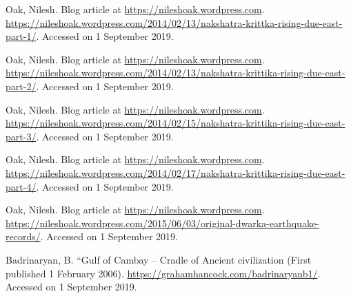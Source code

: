 \begin{thebibliography}{99}
  Oak, Nilesh. Blog article at \url{https://nileshoak.wordpress.com}. \url{https://nileshoak.wordpress.com/2014/02/13/nakshatra-krittka-rising-due-east-part-1/}. Accessed on 1 September 2019.

  Oak, Nilesh. Blog article at \url{ https://nileshoak.wordpress.com}. \url{https://nileshoak.wordpress.com/2014/02/13/nakshatra-krittika-rising-due-east-part-2/}. Accessed on 1 September 2019.

  Oak, Nilesh. Blog article at \url{https://nileshoak.wordpress.com}. \url{https://nileshoak.wordpress.com/2014/02/15/nakshatra-krittika-rising-due-east-part-3/}. Accessed on 1 September 2019.

  Oak, Nilesh. Blog article at \url{https://nileshoak.wordpress.com}. \url{https://nileshoak.wordpress.com/2014/02/17/nakshatra-krittika-rising-due-east-part-4/}. Accessed on 1 September 2019.

  Oak, Nilesh. Blog article at \url{https://nileshoak.wordpress.com}. \url{https://nileshoak.wordpress.com/2015/06/03/original-dwarka-earthquake-records/}. Accessed on 1 September 2019.

  Badrinaryan, B. “Gulf of Cambay – Cradle of Ancient civilization (First published 1 February 2006). \url{https://grahamhancock.com/badrinaryanb1/}. Accessed on 1 September 2019.

 \end{thebibliography}

